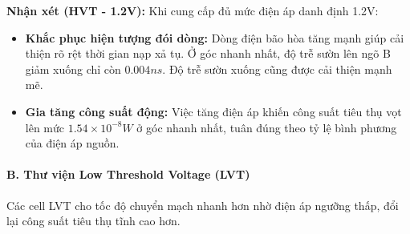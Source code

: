 \documentclass[12pt, a4paper, oneside]{article}
\begin{document}
\textbf{Nhận xét (HVT - 1.2V):} Khi cung cấp đủ mức điện áp danh định 1.2V:
\begin{itemize}
    \item \textbf{Khắc phục hiện tượng đói dòng:} Dòng điện bão hòa tăng mạnh giúp cải thiện rõ rệt thời gian nạp xả tụ. Ở góc nhanh nhất, độ trễ sườn lên ngõ B giảm xuống chỉ còn $0.004ns$. Độ trễ sườn xuống cũng được cải thiện mạnh mẽ.
    \item \textbf{Gia tăng công suất động:} Việc tăng điện áp khiến công suất tiêu thụ vọt lên mức $1.54 \times 10^{-8}W$ ở góc nhanh nhất, tuân đúng theo tỷ lệ bình phương của điện áp nguồn.
\end{itemize}

\paragraph{B. Thư viện Low Threshold Voltage (LVT)}
Các cell LVT cho tốc độ chuyển mạch nhanh hơn nhờ điện áp ngưỡng thấp, đổi lại công suất tiêu thụ tĩnh cao hơn.

\begin{table}[H]
\centering
\renewcommand{\arraystretch}{1.3}
 
\caption{Tổng hợp thông số Diện tích, Công suất và Độ trễ của NAND2 (LVT).}
\label{tab:exp1_nand2_lvt_params}

\end{table}
\end{document}
